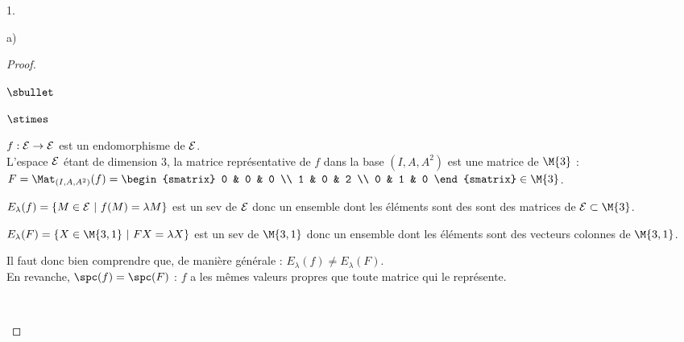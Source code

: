 \documentclass[11pt]{article}%
\begin{document}
\begin{noliste}{1.}
\begin{noliste}{a)}
\begin{proof}
\begin{noliste}{$\sbullet$}
\begin{remark}
\begin{noliste}{$\stimes$}
          \item $f : {\cal E} \to {\cal E}$ est un endomorphisme de
            ${\cal E}$.\\[.2cm]
            L'espace ${\cal E}$ étant de dimension $3$, la matrice
            représentative de $f$ dans la base $(I, A, A^2)$ est une
            matrice de $\M{3}$ : $F = \Mat_{(I,A, A^2)}(f) =
            \begin{smatrix}
              0 & 0 & 0 \\
              1 & 0 & 2 \\
              0 & 1 & 0
            \end{smatrix}
            \in \M{3}$.

          \item $E_\lambda(f) = \{ M \in {\cal E} \ | \ f(M) =
            \lambda M\}$ est un sev de ${\cal E}$ donc un ensemble
            dont les éléments sont des sont des matrices de ${\cal E}
            \subset \M{3}$.
            
          \item $E_\lambda(F) = \{ X \in \M{3,1} \ | \ FX = \lambda
            X\}$ est un sev de $\M{3,1}$ donc un ensemble dont les
            éléments sont des vecteurs colonnes de $\M{3,1}$.
          \end{noliste}
          Il faut donc bien comprendre que, de manière générale :
          $E_\lambda(f) \neq E_\lambda(F)$.\\
          En revanche, $\spc(f) = \spc(F)$ : $f$ a les mêmes valeurs
          propres que toute matrice qui le représente.
    \end{remark}~\\[-1cm]
    

\end{noliste}
\end{proof}
\end{noliste}
\end{noliste}
\end{document}
